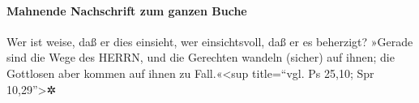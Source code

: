 \hypertarget{mahnende-nachschrift-zum-ganzen-buche}{%
\paragraph{Mahnende Nachschrift zum ganzen
Buche}\label{mahnende-nachschrift-zum-ganzen-buche}}

 Wer ist weise, daß er dies einsieht, wer einsichtsvoll,
daß er es beherzigt? »Gerade sind die Wege des HERRN, und die Gerechten
wandeln (sicher) auf ihnen; die Gottlosen aber kommen auf ihnen zu
Fall.«\textless sup title=``vgl. Ps 25,10; Spr 10,29''\textgreater✲
